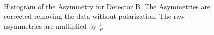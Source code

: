 \begin{figure}[!ht]
\centering
{}
\\
\caption{Histogram of the Asymmetry for Detector B. The Asymmetries are corrected removing the data without polarization. The raw asymmetries are multiplied by $\frac{1}{P}$}
\label{fig:AsymmtriesB0B1B2}
\end{figure}

